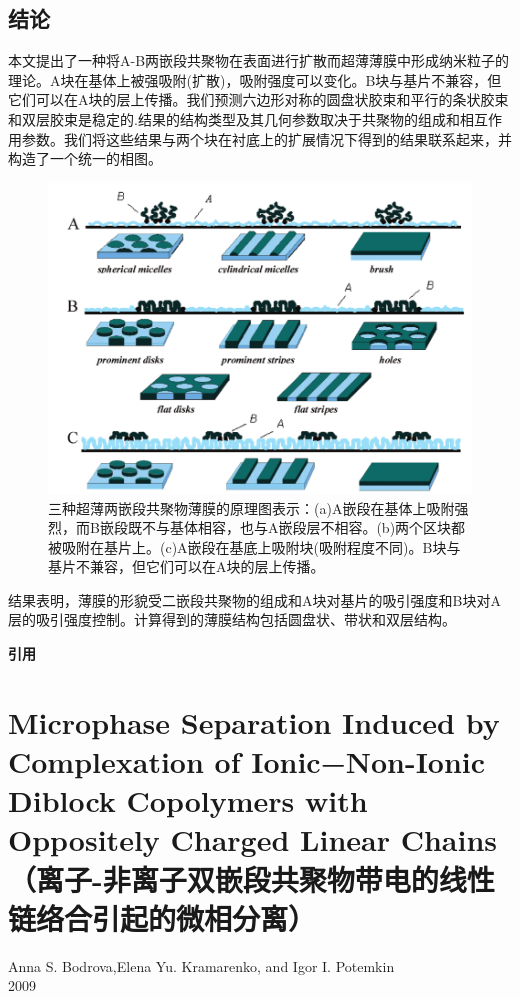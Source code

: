\documentclass[12pt,a4paper]{article}
\numberwithin{equation}{section}
\begin{document}
\subsection{结论}
本文提出了一种将A-B两嵌段共聚物在表面进行扩散而超薄薄膜中形成纳米粒子的理论。A块在基体上被强吸附(扩散)，吸附强度可以变化。B块与基片不兼容，但它们可以在A块的层上传播。我们预测六边形对称的圆盘状胶束和平行的条状胶束和双层胶束是稳定的.结果的结构类型及其几何参数取决于共聚物的组成和相互作用参数。我们将这些结果与两个块在衬底上的扩展情况下得到的结果联系起来，并构造了一个统一的相图。
\begin{figure}[H]
\centering
\includegraphics[scale=0.4]{./figures/6.png}
\caption{三种超薄两嵌段共聚物薄膜的原理图表示：(a)A嵌段在基体上吸附强烈，而B嵌段既不与基体相容，也与A嵌段层不相容。(b)两个区块都被吸附在基片上。(c)A嵌段在基底上吸附块(吸附程度不同)。B块与基片不兼容，但它们可以在A块的层上传播。}
\end{figure}
结果表明，薄膜的形貌受二嵌段共聚物的组成和A块对基片的吸引强度和B块对A层的吸引强度控制。计算得到的薄膜结构包括圆盘状、带状和双层结构。


\textbf{引用}

\section{Microphase Separation Induced by Complexation of Ionic−Non-Ionic Diblock Copolymers with Oppositely Charged Linear Chains（离子-非离子双嵌段共聚物带电的线性链络合引起的微相分离）}
\begin{center}
Anna S. Bodrova,Elena Yu. Kramarenko, and Igor I. Potemkin\\
2009
\end{center}
\end{document}
